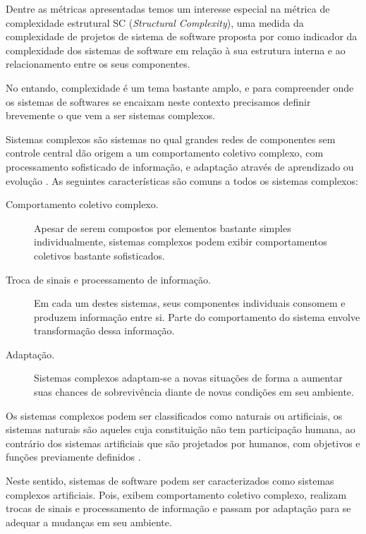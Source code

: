 Dentre as métricas apresentadas temos um interesse especial na métrica de
complexidade estrutural SC ({\it Structural Complexity}), uma medida da
complexidade de projetos de sistema de software proposta por
 como indicador da complexidade dos sistemas de software
em relação à sua estrutura interna e ao relacionamento entre os seus
componentes.

No entando, complexidade é um tema bastante amplo, e para compreender onde os
sistemas de softwares se encaixam neste contexto precisamos definir brevemente
o que vem a ser sistemas complexos.

Sistemas complexos são sistemas no qual grandes redes de componentes sem
controle central dão origem a um comportamento
coletivo complexo, com processamento sofisticado de informação, e adaptação
através de aprendizado ou evolução \cite{Mitchell2009}. As seguintes
características são comuns a todos os sistemas complexos:

\begin{description}

  \item[Comportamento coletivo complexo.] Apesar de serem compostos por
  elementos bastante simples individualmente, sistemas complexos podem exibir
  comportamentos coletivos bastante sofisticados.

  \item[Troca de sinais e processamento de informação.] Em cada um destes
  sistemas, seus componentes individuais consomem e produzem informação entre
  si. Parte do comportamento do sistema envolve transformação dessa informação.

  \item[Adaptação.] Sistemas complexos adaptam-se a novas situações de forma a
  aumentar suas chances de sobrevivência diante de novas condições em seu
  ambiente.

\end{description}

Os sistemas complexos podem ser classificados como naturais ou artificiais, os
sistemas naturais são aqueles cuja constituição não tem participação humana, ao
contrário dos sistemas artificiais que são projetados por humanos, com
objetivos e funções previamente definidos \cite{Simon1996}.

Neste sentido, sistemas de software podem ser caracterizados como sistemas
complexos artificiais. Pois, exibem comportamento coletivo complexo, realizam
trocas de sinais e processamento de informação e passam por adaptação para se
adequar a mudanças em seu ambiente.

